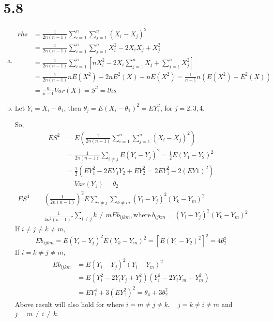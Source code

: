 \documentclass[letterpaper]{article}
\newcommand{\sumi}{\sum_{i=1}^n}
\newcommand{\sumj}{\sum_{j=1}^n}
\begin{document}
    \section*{5.8}
    \begin{enumerate}[(a)]
    \item 
    \begin{align*}
    rhs & = \frac{1}{2n(n-1)} \sumi \sumj (X_i - X_j)^2 \\
    & = \frac{1}{2n(n-1)} \sumi \sumj  X_i^2 - 2X_iX_j + X_j^2 \\
    & = \frac{1}{2n(n-1)} \sumi \left[ n X_i^2 - 2 X_i \sumj X_j + \sumj X_j^2 \right] \\
    & = \frac{1}{2n(n-1)} n E(X^2) - 2 n E^2(X) + n E(X^2) = \frac{1}{n-1} n(E(X^2) - E^2(X)) \\
    & = \frac{n}{n-1} Var(X) = S^2 = lhs
    \end{align*}
    \item Let $Y_i = X_i - \theta_1$, then $\theta_j = E(X_i - \theta_1)^2 = EY_i^2$, for $j = 2, 3, 4$.

    So, 
    \begin{align*}
    ES^2 &= E\left(\frac{1}{2n(n-1)} \sumi \sumj (X_i - X_j)^2\right) \\
    & = \frac{1}{2n(n-1)} \sum_{i \ne j} E(Y_i - Y_j)^2 = \frac{1}{2} E(Y_1 - Y_2)^2 \\
    & = \frac{1}{2} \left(EY_1^2 - 2EY_1Y_2 + EY_2^2 = 2EY_1^2 - 2(EY1)^2\right) \\
    & = Var(Y_1) = \theta_2
    \end{align*}
    \begin{align*}
    ES^4 & = \left(\frac{1}{2n(n-1)}\right)^2 E \sum_{i\ne j} \sum_{k \ne m} (Y_i - Y_j)^2 (Y_k - Y_m)^2 \\
    & = \frac{1}{4n^2(n-1)^2} \sum_{i\ne j}{k\ne m} Eb_{ijkm}, \text{where} ~ b_{ijkm} = (Y_i - Y_j)^2(Y_k - Y_m)^2 
    \end{align*}
    If $ i \ne j \ne k \ne m$,
    \[
    Eb_{ijkm} = E(Y_i-Y_j)^2 E(Y_k - Y_m)^2 = \left[ E(Y_1-Y_2)^2\right]^2 = 4 \theta_2^2
    \]
    If $ i = k \ne j \ne m$,
    \begin{align*}
    Eb_{ijkm} & = E(Y_i-Y_j)^2 (Y_i - Y_m)^2 \\
    & = E(Y_i^2 - 2Y_iY_j + Y_j^2) (Y_i^2 - 2 Y_i Y_m + Y_m^2)\\
    & = EY_1^4 + 3(EY_1^2)^2 = \theta_4 + 3\theta_2^2
    \end{align*}
    Above result will also hold for where $i = m \ne j \ne k, \quad j=k\ne i \ne m$ and $j = m \ne i \ne k$.


\end{enumerate}
\end{document}
